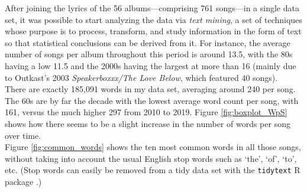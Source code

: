 \documentclass{article}
\begin{document}




After joining the lyrics of the 56 albums---comprising 761 songs---in a single data set, it was possible to start analyzing the data via \textit{text mining}, a set of techniques whose purpose is to process, transform, and study information in the form of text so that statistical conclusions can be derived from it. For instance, the average number of songs per album throughout this period is around 13.5, with the 80s having a low 11.5 and the 2000s having the largest at more than 16 (mainly due to Outkast's 2003 \textit{Speakerboxxx/The Love Below}, which featured 40 songs). \\


There are exactly 185,091 words in my data set, averaging around 240 per song. The 60s are by far the decade with the lowest average word count per song, with 161, versus the much higher 297 from 2010 to 2019. Figure \ref{fig:boxplot_WpS} shows how there seems to be a slight increase in the number of words per song over time. \\

Figure \ref{fig:common_words} shows the ten most common words in all those songs, without taking into account the usual English stop words such as `the', `of', `to', etc. (Stop words can easily be removed from a tidy data set with the \texttt{tidytext} \textsf{R} package \citep{text_mining_r}.)
\end{document}
